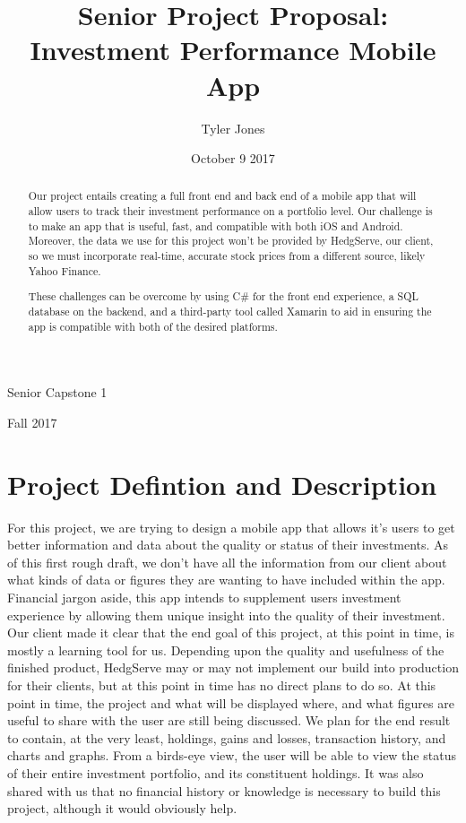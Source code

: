 \documentclass[letterpaper,10pt]{article}
\title{Senior Project Proposal: Investment Performance Mobile App}
\author{Tyler Jones}
\date{October 9 2017}
\begin{document}
\maketitle
\begin{center}
    
Senior Capstone 1

Fall 2017
\end{center}
\begin{abstract}
Our project entails creating a full front end and back end of a mobile app that will allow users to track their investment performance on a portfolio level. Our challenge is to make an app that is useful, fast, and compatible with both iOS and Android. Moreover, the data we use for this project won't be provided by HedgServe, our client, so we must incorporate real-time, accurate stock prices from a different source, likely Yahoo Finance.

These challenges can be overcome by using C\# for the front end experience, a SQL database on the backend, and a third-party tool called Xamarin to aid in ensuring the app is compatible with both of the desired platforms.
\end{abstract}

\newpage
\section{Project Defintion and Description}
For this project, we are trying to design a mobile app that allows it’s users to get better information and data about the quality or status of their investments. As of this first rough draft, we don’t have all the information from our client about what kinds of data or figures they are wanting to have included within the app. Financial jargon aside, this app intends to supplement users investment experience by allowing them unique insight into the quality of their investment. Our client made it clear that the end goal of this project, at this point in time, is mostly a learning tool for us. Depending upon the quality and usefulness of the finished product, HedgServe may or may not implement our build into production for their clients, but at this point in time has no direct plans to do so. At this point in time, the project and what will be displayed where, and what figures are useful to share with the user are still being discussed. We plan for the end result to contain, at the very least, holdings, gains and losses, transaction history, and charts and graphs. From a birds-eye view, the user will be able to view the status of their entire investment portfolio, and its constituent holdings. It was also shared with us that no financial history or knowledge is necessary to build this project, although it would obviously help. 
\end{document}
